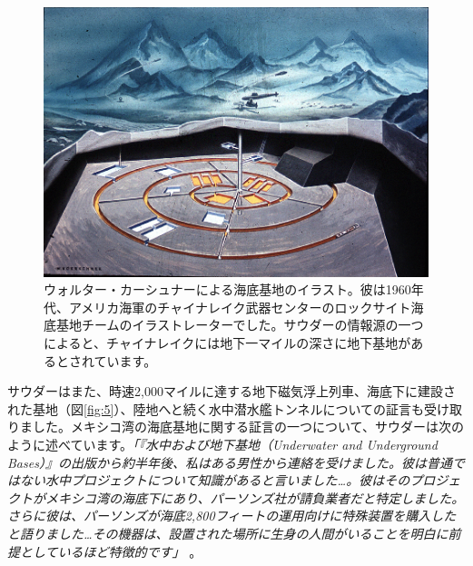 \documentclass[10pt,twocolumn,letterpaper]{article}
\begin{document}
\begin{figure}[t]
\begin{center}
   \includegraphics[width=1\linewidth]{undersea.jpg}
\end{center}
   \caption{ウォルター・カーシュナーによる海底基地のイラスト。彼は1960年代、アメリカ海軍のチャイナレイク武器センターのロックサイト海底基地チームのイラストレーターでした。サウダーの情報源の一つによると、チャイナレイクには地下一マイルの深さに地下基地があるとされています\cite{22,23}。}
\label{fig:5}
\label{fig:onecol}
\end{figure}

サウダーはまた、時速2,000マイルに達する地下磁気浮上列車、海底下に建設された基地（図\ref{fig:5}）、陸地へと続く水中潜水艦トンネルについての証言も受け取りました。メキシコ湾の海底基地に関する証言の一つについて、サウダーは次のように述べています。\textit{「『水中および地下基地（Underwater and Underground Bases）』の出版から約半年後、私はある男性から連絡を受けました。彼は普通ではない水中プロジェクトについて知識があると言いました…。彼はそのプロジェクトがメキシコ湾の海底下にあり、パーソンズ社が請負業者だと特定しました。さらに彼は、パーソンズが海底2,800フィートの運用向けに特殊装置を購入したと語りました…その機器は、設置された場所に生身の人間がいることを明白に前提としているほど特徴的です」} \cite{22}。
\end{document}
